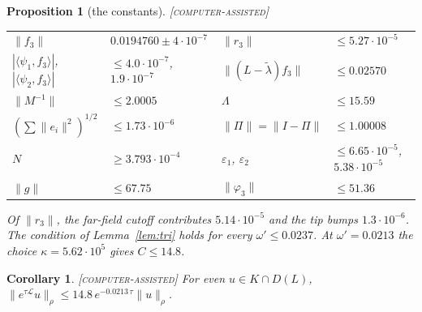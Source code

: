 \documentclass[11pt]{amsart}
\newtheorem{proposition}[theorem]{Proposition}
\newtheorem{corollary}[theorem]{Corollary}
\theoremstyle{definition}
\theoremstyle{remark}
\newcommand{\eps}{\varepsilon}
\newcommand{\ip}[2]{\langle #1,#2\rangle}
\newcommand{\lab}[1]{\textup{\textsc{[#1]}}}
\begin{document}
\begin{proposition}[the constants]\label{prop:consts}\lab{computer-assisted}
\begin{center}\small
\begin{tabular}{@{}ll@{\qquad}ll@{}}
\toprule
$\|f_3\|$ & $0.0194760\pm4\cdot10^{-7}$ & $\|r_3\|$ & $\le5.27\cdot10^{-5}$\\
$|\ip{\psi_1}{f_3}|$, $|\ip{\psi_2}{f_3}|$ & $\le4.0\cdot10^{-7}$, $1.9\cdot10^{-7}$ & $\|(L-\tilde\lambda)f_3\|$ & $\le0.02570$\\
$\|M^{-1}\|$ & $\le2.0005$ & $\Lambda$ & $\le15.59$\\
$(\sum\|e_i\|^2)^{1/2}$ & $\le1.73\cdot10^{-6}$ & $\|\Pi\|=\|I-\Pi\|$ & $\le1.00008$\\
$N$ & $\ge3.793\cdot10^{-4}$ & $\eps_1$, $\eps_2$ & $\le6.65\cdot10^{-5}$, $5.38\cdot10^{-5}$\\
$\|g\|$ & $\le67.75$ & $\|\varphi_3\|$ & $\le51.36$\\
\bottomrule
\end{tabular}
\end{center}
Of $\|r_3\|$, the far-field cutoff contributes $5.14\cdot10^{-5}$ and the tip bumps $1.3\cdot10^{-6}$.
The condition of Lemma~\ref{lem:tri} holds for every $\omega'\le0.0237$. At $\omega'=0.0213$ the choice $\kappa=5.62\cdot10^5$ gives $C\le14.8$.
\end{proposition}

\begin{corollary}\label{cor:decay}\lab{computer-assisted}
For even $u\in K\cap D(L)$, $\|e^{\tau\mathcal L}u\|_\rho\le14.8\,e^{-0.0213\,\tau}\|u\|_\rho$.
\end{corollary}
\end{document}
